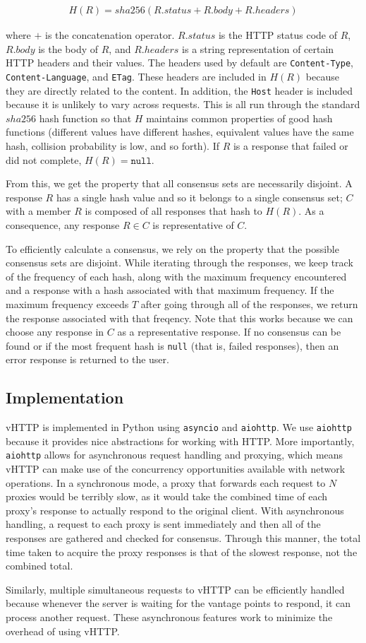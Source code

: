 \begin{align*}
  H(R) = sha256(R.status + R.body + R.headers)
\end{align*}

where $+$ is the concatenation operator. $R.status$ is the HTTP status code of
$R$, $R.body$ is the body of $R$, and $R.headers$ is a string representation
of certain HTTP headers and their values. The headers used by default are
\texttt{Content-Type}, \texttt{Content-Language}, and \texttt{ETag}. These
headers are included in $H(R)$ because they are directly related to the
content. In addition, the \texttt{Host} header is included because it is
unlikely to vary across requests. This is all run through the standard $sha256$
hash function so that $H$ maintains common properties of good hash functions
(different values have different hashes, equivalent values have the same hash,
collision probability is low, and so forth). If $R$ is a response that failed
or did not complete, $H(R) = \texttt{null}$.

From this, we get the property that all consensus sets are necessarily
disjoint. A response $R$ has a single hash value and so it belongs to a single
consensus set; $C$ with a member $R$ is composed of all responses that hash to
$H(R)$. As a consequence, any response $R \in C$ is representative of $C$.

To efficiently calculate a consensus, we rely on the property that the possible
consensus sets are disjoint. While iterating through the responses, we
keep track of the frequency of each hash, along with the maximum frequency
encountered and a response with a hash associated with that maximum frequency.
If the maximum frequency exceeds $T$ after going through all of the responses,
we return the response associated with that freqency. Note that this works
because we can choose any response in $C$ as a representative response.
If no consensus can be found or if the most frequent hash is \texttt{null}
(that is, failed responses), then an error response is returned to the user.



\subsection{Implementation}

vHTTP is implemented in Python using \texttt{asyncio} and \texttt{aiohttp}.
We use \texttt{aiohttp} because it provides nice abstractions for working with
HTTP. More importantly, \texttt{aiohttp} allows for asynchronous request
handling and proxying, which means vHTTP can make use of the concurrency
opportunities available with network operations. In a synchronous mode, a
proxy that forwards each request to $N$ proxies would be terribly slow, as it
would take the combined time of each proxy's response to actually respond to
the original client. With asynchronous handling, a request to each proxy is
sent immediately and then all of the responses are gathered and checked for
consensus. Through this manner, the total time taken to acquire the proxy
responses is that of the slowest response, not the combined total.

Similarly, multiple simultaneous requests to vHTTP can be efficiently handled
because whenever the server is waiting for the vantage points to respond, it
can process another request. These asynchronous features work to minimize
the overhead of using vHTTP.
